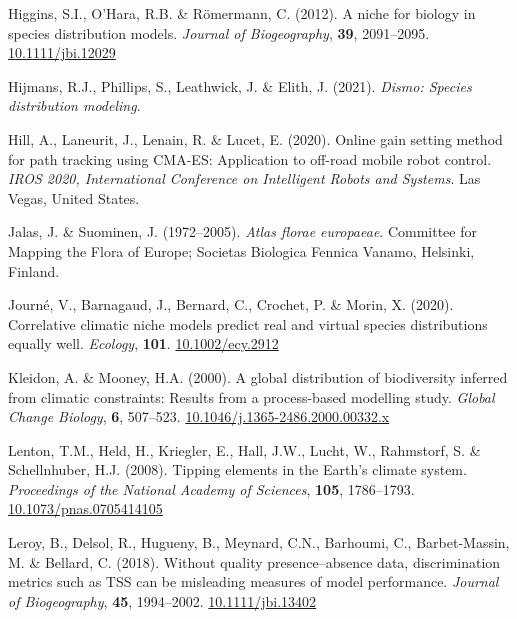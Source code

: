 \documentclass[11pt,]{article}
\newlength{\cslhangindent}
\newenvironment{CSLReferences}[2] %
 {%
  \setlength{\parindent}{0pt}
  \ifodd #1 \everypar{\setlength{\hangindent}{\cslhangindent}}\ignorespaces\fi
  \ifnum #2 > 0
  \setlength{\parskip}{#2\baselineskip}
  \fi
 }%
 {}
\begin{document}
\begin{CSLReferences}{1}{0}
\leavevmode{}%
Higgins, S.I., O'Hara, R.B. \& Römermann, C. (2012). A niche for biology
in species distribution models. \emph{Journal of Biogeography},
\textbf{39}, 2091--2095.
\href{https://doi.org/10.1111/jbi.12029}{10.1111/jbi.12029}

\leavevmode{}%
Hijmans, R.J., Phillips, S., Leathwick, J. \& Elith, J. (2021).
\emph{Dismo: Species distribution modeling}.

\leavevmode{}%
Hill, A., Laneurit, J., Lenain, R. \& Lucet, E. (2020). {Online gain
setting method for path tracking using CMA-ES: Application to off-road
mobile robot control}. \emph{{IROS 2020, International Conference on
Intelligent Robots and Systems}}. Las Vegas, United States.

\leavevmode{}%
Jalas, J. \& Suominen, J. (1972--2005). \emph{Atlas florae europaeae}.
Committee for Mapping the Flora of Europe; Societas Biologica Fennica
Vanamo, Helsinki, Finland.

\leavevmode{}%
Journé, V., Barnagaud, J., Bernard, C., Crochet, P. \& Morin, X. (2020).
Correlative climatic niche models predict real and virtual species
distributions equally well. \emph{Ecology}, \textbf{101}.
\href{https://doi.org/10.1002/ecy.2912}{10.1002/ecy.2912}

\leavevmode{}%
Kleidon, A. \& Mooney, H.A. (2000). A global distribution of
biodiversity inferred from climatic constraints: Results from a
process-based modelling study. \emph{Global Change Biology}, \textbf{6},
507--523.
\href{https://doi.org/10.1046/j.1365-2486.2000.00332.x}{10.1046/j.1365-2486.2000.00332.x}

\leavevmode{}%
Lenton, T.M., Held, H., Kriegler, E., Hall, J.W., Lucht, W., Rahmstorf,
S. \& Schellnhuber, H.J. (2008). Tipping elements in the {Earth}'s
climate system. \emph{Proceedings of the National Academy of Sciences},
\textbf{105}, 1786--1793.
\href{https://doi.org/10.1073/pnas.0705414105}{10.1073/pnas.0705414105}

\leavevmode{}%
Leroy, B., Delsol, R., Hugueny, B., Meynard, C.N., Barhoumi, C.,
Barbet-Massin, M. \& Bellard, C. (2018). Without quality
presence--absence data, discrimination metrics such as {TSS} can be
misleading measures of model performance. \emph{Journal of
Biogeography}, \textbf{45}, 1994--2002.
\href{https://doi.org/10.1111/jbi.13402}{10.1111/jbi.13402}


\end{CSLReferences}
\end{document}

